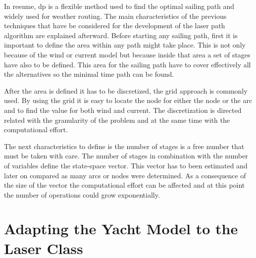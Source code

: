 \hspace{5mm}
In resume,
\acrshort{dp} is a flexible method used to find the optimal sailing path and widely used for weather routing. The main characteristics of the previous techniques that have be considered for the development of the laser path algorithm are explained afterward. Before starting any sailing path, first it is important to define the area within any path might take place. This is not only because of the wind or current model but because inside that area a set of stages have also to be defined. This area for the sailing path have to cover effectively all the alternatives so the minimal time path can be found. \par 
After the area is defined it has to be discretized, the grid approach is commonly used. By using the grid it is easy to locate the node for either the node or the arc and to find the value for both wind and current. The discretization is directed related with the granularity of the problem and at the same time with the computational effort. \par 
The next characteristics to define is the number of stages is a free number that must be taken with care. The number of stages in combination with the number of variables define the state-space vector. This vector has to been estimated and later on compared as many arcs or nodes were determined. As a consequence of the size of the vector the computational effort can be affected and at this point the number of operations could grow exponentially.

\section{Adapting the Yacht Model to the Laser Class} \label{sec:laser_yacht}

